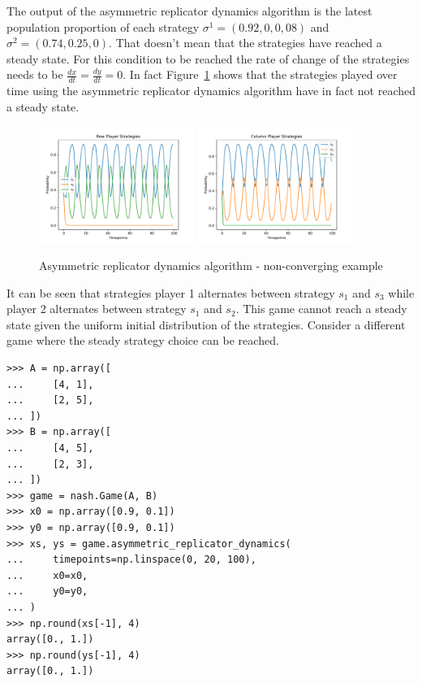 The output of the asymmetric replicator dynamics algorithm is the latest
population proportion of each strategy \(\sigma^1 = (0.92, 0, 0,08)\) and
\(\sigma^2 = (0.74, 0.25, 0)\).
That doesn't mean that the strategies have reached a steady state.
For this condition to be reached the rate of change of the strategies needs to
be \(\frac{dx}{dt} = \frac{dy}{dt} = 0\).
In fact Figure~\ref{fig:asymmetric_replicator_dynamics} shows that the
strategies played over time using the asymmetric replicator dynamics algorithm
have in fact not reached a steady state.

\begin{figure}[H]
    \centering
    \includegraphics[width=0.45\textwidth]{chapters/04_game_theoretic_model/img/learning_algorithms_example/asymmetric_rd_row.pdf}
    \includegraphics[width=0.45\textwidth]{chapters/04_game_theoretic_model/img/learning_algorithms_example/asymmetric_rd_col.pdf}
    \caption{Asymmetric replicator dynamics algorithm - non-converging example}
    \label{fig:asymmetric_replicator_dynamics}
\end{figure}

It can be seen that strategies player 1 alternates between strategy \(s_1\) and
\(s_3\) while player 2 alternates between strategy \(s_1\) and \(s_2\).
This game cannot reach a steady state given the uniform initial distribution of
the strategies.
Consider a different game where the steady strategy choice can be reached.

\begin{lstlisting}[style=pystyle]
>>> A = np.array([
...     [4, 1],
...     [2, 5],
... ])
>>> B = np.array([
...     [4, 5],
...     [2, 3],
... ])
>>> game = nash.Game(A, B)
>>> x0 = np.array([0.9, 0.1])
>>> y0 = np.array([0.9, 0.1])
>>> xs, ys = game.asymmetric_replicator_dynamics(
...     timepoints=np.linspace(0, 20, 100),
...     x0=x0,
...     y0=y0,
... )
>>> np.round(xs[-1], 4)
array([0., 1.])
>>> np.round(ys[-1], 4)
array([0., 1.])

\end{lstlisting}

